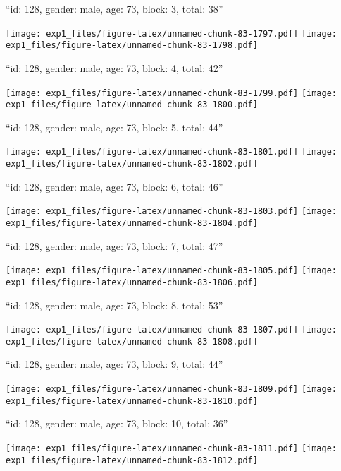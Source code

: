 \documentclass[11pt,,]{article}
\begin{document}
\newpage
[1] 

``id: 128, gender: male, age: 73, block: 3, total: 38''

\texttt{[image: exp1\_files/figure-latex/unnamed-chunk-83-1797.pdf]}
\texttt{[image: exp1\_files/figure-latex/unnamed-chunk-83-1798.pdf]}

\newpage
[1] 

``id: 128, gender: male, age: 73, block: 4, total: 42''

\texttt{[image: exp1\_files/figure-latex/unnamed-chunk-83-1799.pdf]}
\texttt{[image: exp1\_files/figure-latex/unnamed-chunk-83-1800.pdf]}

\newpage
[1] 

``id: 128, gender: male, age: 73, block: 5, total: 44''

\texttt{[image: exp1\_files/figure-latex/unnamed-chunk-83-1801.pdf]}
\texttt{[image: exp1\_files/figure-latex/unnamed-chunk-83-1802.pdf]}

\newpage
[1] 

``id: 128, gender: male, age: 73, block: 6, total: 46''

\texttt{[image: exp1\_files/figure-latex/unnamed-chunk-83-1803.pdf]}
\texttt{[image: exp1\_files/figure-latex/unnamed-chunk-83-1804.pdf]}

\newpage
[1] 

``id: 128, gender: male, age: 73, block: 7, total: 47''

\texttt{[image: exp1\_files/figure-latex/unnamed-chunk-83-1805.pdf]}
\texttt{[image: exp1\_files/figure-latex/unnamed-chunk-83-1806.pdf]}

\newpage
[1] 

``id: 128, gender: male, age: 73, block: 8, total: 53''

\texttt{[image: exp1\_files/figure-latex/unnamed-chunk-83-1807.pdf]}
\texttt{[image: exp1\_files/figure-latex/unnamed-chunk-83-1808.pdf]}

\newpage
[1] 

``id: 128, gender: male, age: 73, block: 9, total: 44''

\texttt{[image: exp1\_files/figure-latex/unnamed-chunk-83-1809.pdf]}
\texttt{[image: exp1\_files/figure-latex/unnamed-chunk-83-1810.pdf]}

\newpage
[1] 

``id: 128, gender: male, age: 73, block: 10, total: 36''

\texttt{[image: exp1\_files/figure-latex/unnamed-chunk-83-1811.pdf]}
\texttt{[image: exp1\_files/figure-latex/unnamed-chunk-83-1812.pdf]}
\end{document}
